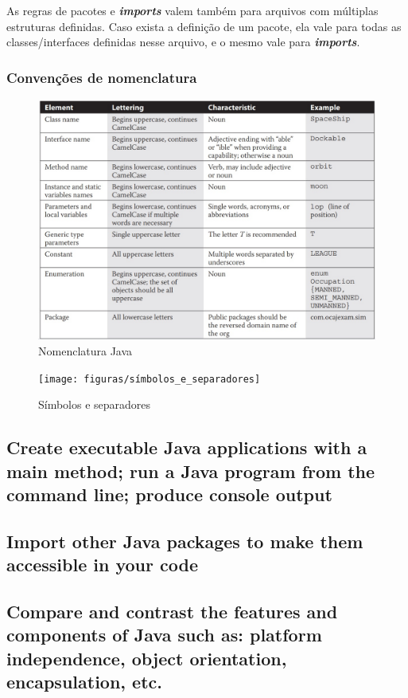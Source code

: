 \documentclass[12pt]{article}
\begin{document}
As regras de pacotes e \textbf{\textit{imports}} valem também para arquivos com múltiplas estruturas definidas. Caso exista a definição de um pacote, ela vale para todas as classes/interfaces definidas nesse arquivo, e o mesmo vale para \textbf{\textit{imports}}.

\subsubsection{Convenções de nomenclatura}

\begin{figure}[H]
	\centering
	\includegraphics[width=1\linewidth]{figuras/nomenclatura}
	\caption[Nomenclatura Java]{Nomenclatura Java}
	\label{fig:nomenclatura}
\end{figure}

\begin{figure}[H]
	\centering
	\texttt{[image: figuras/símbolos\_e\_separadores]}
	\caption[Símbolos e separadores]{Símbolos e separadores}
	\label{fig:simboloseseparadores}
\end{figure}


\subsection*{Create executable Java applications with a main method; run a Java program from the command line; produce console output}





\newpage

\subsection*{Import other Java packages to make them accessible in your code}
\subsection*{Compare and contrast the features and components of Java such as: platform independence, object orientation, encapsulation, etc.}

	
\end{document}
